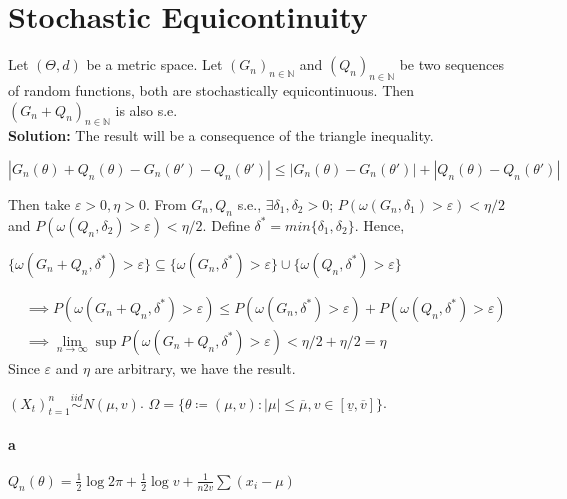 \documentclass[11pt,letterpaper]{article}                  %
\begin{document}

\section{Stochastic Equicontinuity}
\begin{problem}
Let $(\Theta, d)$ be a metric space. Let $(G_n)_{n \in \mathbb{N}}$ and $(Q_n)_{n \in \mathbb{N}}$ be two sequences of random functions, both are stochastically equicontinuous. Then $(G_n + Q_n)_{n \in \mathbb{N}}$ is also s.e.\\

\textbf{Solution:} The result will be a consequence of the triangle inequality.
\begin{center}
$|G_n(\theta)+Q_n(\theta)-G_n(\theta')-Q_n(\theta')|\leq |G_n(\theta)-G_n(\theta')|+|Q_n(\theta)-Q_n(\theta')|$
\end{center}
Then take $\varepsilon>0, \eta>0$. From $G_n, Q_n$ s.e., $\exists \delta_1,\delta_2>0$; $P(\omega(G_n,\delta_1)>\varepsilon)<\eta/2$ and $P(\omega(Q_n,\delta_2)>\varepsilon)<\eta/2$. Define $\delta^*=min\{\delta_1,\delta_2\}$. Hence,
\begin{center}
$\{\omega(G_n+Q_n,\delta^*)>\varepsilon\} \subseteq \{\omega(G_n,\delta^*)>\varepsilon\} \cup \{\omega(Q_n,\delta^*)>\varepsilon\}$
\end{center}
\begin{align*}
&\implies P(\omega(G_n+Q_n,\delta^*)>\varepsilon)\leq P(\omega(G_n,\delta^*)>\varepsilon) + P(\omega(Q_n,\delta^*)>\varepsilon)\\
&\implies \lim_{n\to\infty}\sup P(\omega(G_n+Q_n,\delta^*)>\varepsilon) < \eta/2+\eta/2=\eta
\end{align*}
Since $\varepsilon$ and $\eta$ are arbitrary, we have the result.
\end{problem}

\bigskip
\begin{problem}
\end{problem}

\bigskip
\begin{problem}
$(X_t)_{t=1}^{n} \overset{iid}{\sim} N(\mu, v) $. $\Omega = \{ \theta
\coloneqq (\mu,
v): |\mu| \le \overline{\mu}, v \in [\underline{v}, \overline{v}]\}$.
\paragraph*{a}
$Q_n(\theta) = \tfrac{1}{2}\log 2\pi + \tfrac{1}{2} \log v +
\tfrac{1}{n2v} \sum(x_i - \mu)$
\end{problem}
\end{document}

